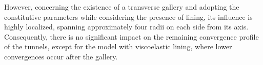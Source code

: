 \documentclass[a4paper,fleqn]{cas-sc}
\begin{document}
However, concerning the existence of a transverse gallery and adopting the constitutive parameters while considering the presence of lining, its influence is highly localized, spanning approximately four radii on each side from its axis. Consequently, there is no significant impact on the remaining convergence profile of the tunnels, except for the model with viscoelastic lining, where lower convergences occur after the gallery. 

%

%
%

%
%
\end{document}
